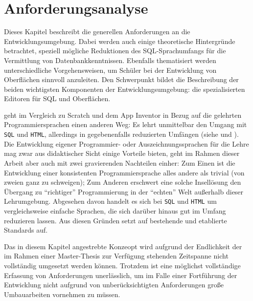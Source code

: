 \section{Anforderungsanalyse}
\label{sec:requirements}

Dieses Kapitel beschreibt die generellen Anforderungen an die Entwicklungsumgebung. Dabei werden auch einige theoretische Hintergründe betrachtet, speziell mögliche Reduktionen des SQL-Sprachumfangs für die Vermittlung von Datenbankkenntnissen. Ebenfalls thematisiert werden unterschiedliche Vorgehensweisen, um Schüler bei der Entwicklung von Oberflächen sinnvoll anzuleiten. Den Schwerpunkt bildet die Beschreibung der beiden wichtigsten Komponenten der Entwicklungsumgebung: die spezialisierten Editoren für SQL und Oberflächen.


\idename{} geht im Vergleich zu Scratch und dem App Inventor in Bezug auf die gelehrten Programmiersprachen einen anderen Weg: Es lehrt unmittelbar den Umgang mit \texttt{SQL} und \texttt{HTML}, allerdings in gegebenenfalls reduzierten Umfängen (siehe  und ). Die Entwicklung eigener Programmier- oder Auszeichnungssprachen für die Lehre mag zwar aus didaktischer Sicht einige Vorteile bieten, geht im Rahmen dieser Arbeit aber auch mit zwei gravierenden Nachteilen einher: Zum Einen ist die Entwicklung einer konsistenten Programmiersprache alles andere als trivial (von zweien ganz zu schweigen); Zum Anderen erschwert eine solche Insellösung den Übergang zu "`richtiger"' Programmierung in der "`echten"' Welt außerhalb dieser Lehrumgebung. Abgesehen davon handelt es sich bei \texttt{SQL} und \texttt{HTML} um vergleichsweise einfache Sprachen, die sich darüber hinaus gut im Umfang reduzieren lassen. Aus diesen Gründen setzt \idename{} auf bestehende und etablierte Standards auf.

Das in diesem Kapitel angestrebte Konzeopt wird aufgrund der Endlichkeit der im Rahmen einer Master-Thesis zur Verfügung stehenden Zeitspanne nicht vollständig umgesetzt werden können. Trotzdem ist eine möglichst vollständige Erfassung von Anforderungen unerlässlich, um im Falle einer Fortführung der Entwicklung nicht aufgrund von unberücksichtigten Anforderungen große Umbauarbeiten vornehmen zu müssen.

